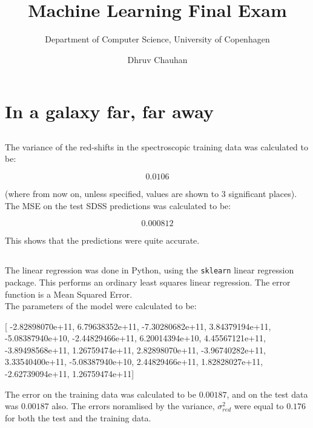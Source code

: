 \documentclass{scrartcl}
\begin{document}
\title{Machine Learning Final Exam}
\subtitle{Department of Computer Science, University of Copenhagen}
\author{Dhruv Chauhan}
\maketitle

\section{In a galaxy far, far away}
\subsection{}
The variance of the red-shifts in the spectroscopic training data was calculated to be:

\[ 0.0106 \]

(where from now on, unless specified, values are shown to 3 significant places). \\

The MSE on the test SDSS predictions was calculated to be:

\[ 0.000812 \]

This shows that the predictions were quite accurate.

\subsection{}

The linear regression was done in Python, using the \texttt{sklearn} linear regression package. This performs an ordinary least squares linear regression. The error function is a Mean Squared Error. \\

The parameters of the model were calculated to be:

\begin{center}
[  -2.82898070e+11,   6.79638352e+11, -7.30280682e+11,  3.84379194e+11, \\
   -5.08387940e+10,  -2.44829466e+11,  6.20014394e+10,  4.45567121e+11, \\
   -3.89498568e+11,   1.26759474e+11,  2.82898070e+11, -3.96740282e+11, \\
    3.33540400e+11,  -5.08387940e+10,  2.44829466e+11,  1.82828027e+11, \\
   -2.62739094e+11,   1.26759474e+11]
\end{center}

The error on the training data was calculated to be $0.00187$, and on the test data was $0.00187$ also. The errors noramlised by the variance, $\sigma^2_{red}$ were equal to $0.176$ for both the test and the training data. \\
\end{document}
